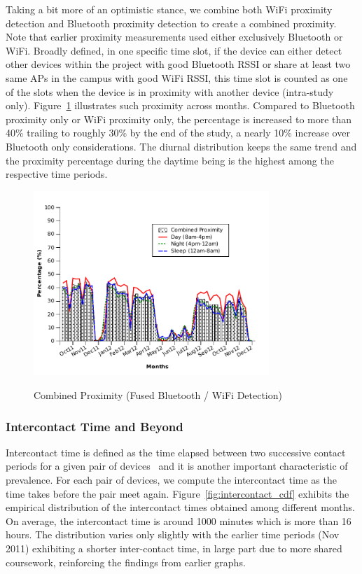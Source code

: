 Taking a bit more of an optimistic stance, we combine both WiFi proximity detection and Bluetooth proximity detection to create a combined proximity.  Note that earlier proximity measurements used either exclusively Bluetooth or WiFi.  Broadly defined, in one specific time slot, if the device can either detect other devices within the project with good Bluetooth RSSI or share at least two same APs in the campus with good WiFi RSSI, this time slot is counted as one of the slots when the device is in proximity with another device (intra-study only). Figure~\ref{fig:bt_wifi} illustrates such proximity across months. Compared to Bluetooth proximity only or WiFi proximity only, the percentage is increased to more than 40\% trailing to roughly 30\% by the end of the study, a nearly 10\% increase over Bluetooth only considerations. The diurnal distribution keeps the same trend and the proximity percentage during the daytime being is the highest among the respective time periods.

\begin{figure}[tbp]
\centering 
{\includegraphics[width=3.5in]{graphs/weekly_bt_wifi.pdf}}
\caption{Combined Proximity (Fused Bluetooth / WiFi Detection)} 
\label{fig:bt_wifi}
\end{figure} 

\subsubsection{Intercontact Time and Beyond}
Intercontact time is defined as the time elapsed between two successive contact periods for a given pair of devices~\cite{chaintreau2007impact} and it is another important characteristic of prevalence. For each pair of devices, we compute the intercontact time as the time takes before the pair meet again. Figure~\ref{fig:intercontact_cdf} exhibits the empirical distribution of the intercontact times obtained among different months. On average, the intercontact time is around 1000 minutes which is more than 16 hours. The distribution varies only slightly with the earlier time periods (Nov 2011) exhibiting a shorter inter-contact time, in large part due to more shared coursework, reinforcing the findings from earlier graphs.  

